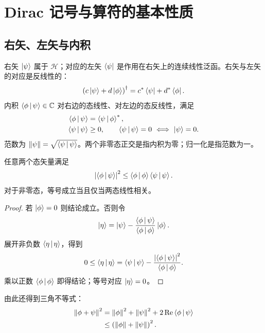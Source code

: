 \section{Dirac 记号与算符的基本性质}
\subsection{右矢、左矢与内积}
右矢 $\Ket{\psi}$ 属于 $\mathcal H$；对应的左矢 $\Bra{\psi}$ 是作用在右矢上的连续线性泛函。右矢与左矢的对应是反线性的：
\begin{equation}
\left(c\Ket{\psi}+d\Ket{\phi}\right)^\dagger
=c^*\Bra{\psi}+d^*\Bra{\phi}.
\end{equation}
内积 $\Braket{\phi|\psi}\in\mathbb{C}$ 对右边的态线性、对左边的态反线性，满足
\begin{align}
\Braket{\phi|\psi}&=\Braket{\psi|\phi}^*,\\
\Braket{\psi|\psi}&\geq0,\qquad
\Braket{\psi|\psi}=0\ \Longleftrightarrow\ \Ket{\psi}=0.
\end{align}
范数为 $\left\|\psi\right\|=\sqrt{\Braket{\psi|\psi}}$。两个非零态正交是指内积为零；归一化是指范数为一。

\begin{theorem}
任意两个态矢量满足
\begin{equation}
\left|\Braket{\phi|\psi}\right|^2\leq
\Braket{\phi|\phi}\Braket{\psi|\psi}.
\label{eq:schwarz}
\end{equation}
对于非零态，等号成立当且仅当两态线性相关。
\end{theorem}
\begin{proof}
若 $\Ket{\phi}=0$ 则结论成立。否则令
\begin{equation}
\Ket{\eta}=\Ket{\psi}-\frac{\Braket{\phi|\psi}}{\Braket{\phi|\phi}}\Ket{\phi}.
\end{equation}
展开非负数 $\Braket{\eta|\eta}$，得到
\begin{equation}
0\leq\Braket{\eta|\eta}
=\Braket{\psi|\psi}-\frac{\left|\Braket{\phi|\psi}\right|^2}{\Braket{\phi|\phi}}.
\end{equation}
乘以正数 $\Braket{\phi|\phi}$ 即得结论；等号对应 $\Ket{\eta}=0$。
\end{proof}
由此还得到三角不等式：
\begin{align}
\left\|\phi+\psi\right\|^2
&=\left\|\phi\right\|^2+\left\|\psi\right\|^2+2\operatorname{Re}\Braket{\phi|\psi}\\
&\leq\left(\left\|\phi\right\|+\left\|\psi\right\|\right)^2.
\end{align}

